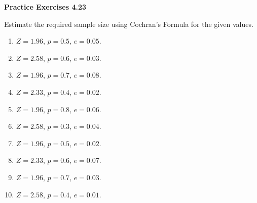 \vspace{0.3ex}
\noindent\textbf{Practice Exercises 4.23}

\vspace{0.2ex}

Estimate the required sample size using Cochran’s Formula for the given values.
\begin{multicols}{2}
\begin{enumerate}
    \item \(Z = 1.96\), \(p = 0.5\), \(e = 0.05\).
    \item \(Z = 2.58\), \(p = 0.6\), \(e = 0.03\).
    \item \(Z = 1.96\), \(p = 0.7\), \(e = 0.08\).
    \item \(Z = 2.33\), \(p = 0.4\), \(e = 0.02\).
    \item \(Z = 1.96\), \(p = 0.8\), \(e = 0.06\).
    \item \(Z = 2.58\), \(p = 0.3\), \(e = 0.04\).
    \item \(Z = 1.96\), \(p = 0.5\), \(e = 0.02\).
    \item \(Z = 2.33\), \(p = 0.6\), \(e = 0.07\).
    \item \(Z = 1.96\), \(p = 0.7\), \(e = 0.03\).
    \item \(Z = 2.58\), \(p = 0.4\), \(e = 0.01\).
\end{enumerate}
\end{multicols}
